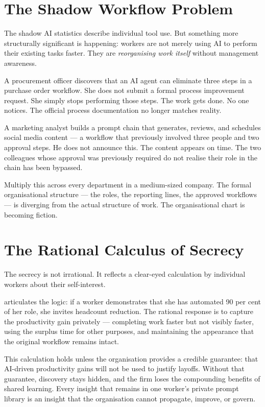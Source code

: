 \section{The Shadow Workflow Problem}

The shadow AI statistics describe individual tool use. But something more structurally significant is happening: workers are not merely using AI to perform their existing tasks faster. They are \emph{reorganising work itself} without management awareness.

A procurement officer discovers that an AI agent can eliminate three steps in a purchase order workflow. She does not submit a formal process improvement request. She simply stops performing those steps. The work gets done. No one notices. The official process documentation no longer matches reality.

A marketing analyst builds a prompt chain that generates, reviews, and schedules social media content --- a workflow that previously involved three people and two approval steps. He does not announce this. The content appears on time. The two colleagues whose approval was previously required do not realise their role in the chain has been bypassed.

Multiply this across every department in a medium-sized company. The formal organisational structure --- the roles, the reporting lines, the approved workflows --- is diverging from the actual structure of work. The organisational chart is becoming fiction.

\section{The Rational Calculus of Secrecy}

The secrecy is not irrational. It reflects a clear-eyed calculation by individual workers about their self-interest.

\textcite{Mollick2023SecretCyborgs} articulates the logic: if a worker demonstrates that she has automated 90 per cent of her role, she invites headcount reduction. The rational response is to capture the productivity gain privately --- completing work faster but not visibly faster, using the surplus time for other purposes, and maintaining the appearance that the original workflow remains intact.

This calculation holds unless the organisation provides a credible guarantee: that AI-driven productivity gains will not be used to justify layoffs. Without that guarantee, discovery stays hidden, and the firm loses the compounding benefits of shared learning. Every insight that remains in one worker's private prompt library is an insight that the organisation cannot propagate, improve, or govern.


